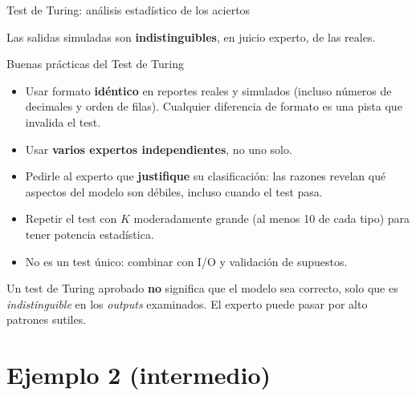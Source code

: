 \documentclass[aspectratio=1610, 10pt]{beamer}
\begin{document}
\begin{frame}{Test de Turing: análisis estadístico de los aciertos}
  \vspace{4pt}
  \begin{resultadobox}[Conclusión]
    \footnotesize
    Las salidas simuladas son \textbf{indistinguibles}, en juicio experto, de
    las reales.
  \end{resultadobox}
\end{frame}

\begin{frame}{Buenas prácticas del Test de Turing}
  \footnotesize
  \begin{itemize}\itemsep2pt
    \item Usar formato \textbf{idéntico} en reportes reales y simulados (incluso
      números de decimales y orden de filas). Cualquier diferencia de formato
      es una pista que invalida el test.
    \item Usar \textbf{varios expertos independientes}, no uno solo.
    \item Pedirle al experto que \textbf{justifique} su clasificación: las
      razones revelan qué aspectos del modelo son débiles, incluso cuando el
      test pasa.
    \item Repetir el test con $K$ moderadamente grande (al menos 10 de cada
      tipo) para tener potencia estadística.
    \item No es un test único: combinar con I/O y validación de supuestos.
  \end{itemize}

  \vspace{6pt}
  \begin{alertabox}[Cuidado]
    \footnotesize
    Un test de Turing aprobado \textbf{no} significa que el modelo sea correcto,
    solo que es \emph{indistinguible} en los \emph{outputs} examinados. El
    experto puede pasar por alto patrones sutiles.
  \end{alertabox}
\end{frame}

\section{Ejemplo 2 (intermedio)}
\end{document}
